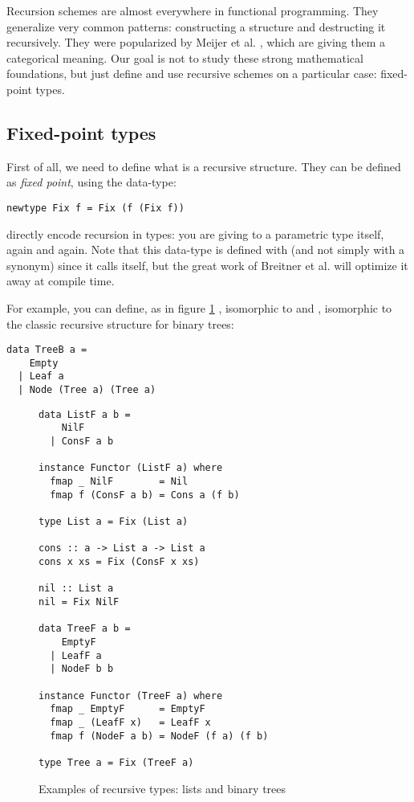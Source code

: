 
Recursion schemes are almost everywhere in functional programming. They generalize very common patterns: constructing a structure and destructing it recursively. They were popularized by Meijer et al. \cite{4cec4a43c86444479dc0003182424795}, which are giving them a categorical meaning. Our goal is not to study these strong mathematical foundations, but just define and use recursive schemes on a particular case: fixed-point types.

\subsection{Fixed-point types}
\label{subsec:defi}
First of all, we need to define what is a recursive structure. They can be defined as \emph{fixed point}, using the  data-type:
\begin{verbatim}
newtype Fix f = Fix (f (Fix f))
\end{verbatim}
 directly encode recursion in types: you are giving to a parametric type itself, again and again. Note that this data-type is defined with  (and not simply with a  synonym) since it calls itself, but the great work of Breitner et al. \cite{Breitner:2014:SZC:2692915.2628141} will optimize it away at compile time.

For example, you can define, as in figure \ref{fig:listtree}
, isomorphic to \minline{[a]} and , isomorphic to the classic recursive structure for binary trees:
\begin{verbatim}
data TreeB a =
    Empty
  | Leaf a
  | Node (Tree a) (Tree a)
\end{verbatim}

\begin{figure}
\begin{verbatim}
data ListF a b =
    NilF
  | ConsF a b

instance Functor (ListF a) where
  fmap _ NilF        = Nil
  fmap f (ConsF a b) = Cons a (f b)

type List a = Fix (List a)

cons :: a -> List a -> List a
cons x xs = Fix (ConsF x xs)

nil :: List a
nil = Fix NilF

data TreeF a b =
    EmptyF
  | LeafF a
  | NodeF b b

instance Functor (TreeF a) where
  fmap _ EmptyF      = EmptyF
  fmap _ (LeafF x)   = LeafF x
  fmap f (NodeF a b) = NodeF (f a) (f b)

type Tree a = Fix (TreeF a)
\end{verbatim}
\caption{Examples of recursive types: lists and binary trees}
\label{fig:listtree}
\end{figure}

